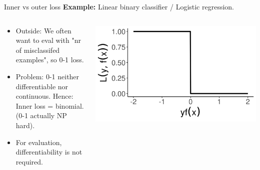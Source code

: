 \begin{vbframe}{Inner vs outer loss}
\textbf{Example:} Linear binary classifier / Logistic regression.
\begin{columns}
\begin{column}{0.7\textwidth}
\small
\begin{itemize}
  \item Outside: We often want to eval with "nr of misclassifed examples",
      so 0-1 loss.
  \item Problem: 0-1 neither differentiable nor continuous.
  Hence: Inner loss = binomial.\\
  (0-1 actually NP hard).
  \item For evaluation, differentiability is not required.
\end{itemize}
\end{column}
\begin{column}{0.3\textwidth}
\begin{center}    
  \includegraphics[width=1.0\textwidth]{figure/plot_loss_01}
\end{center}    
\end{column}
\end{columns}


\end{vbframe}





